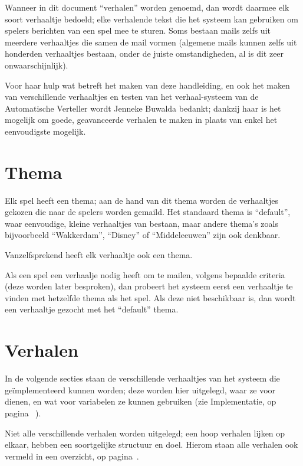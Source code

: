 \documentclass[12pt]{article}
\begin{document}
  Wanneer in dit document ``verhalen'' worden genoemd, dan wordt daarmee elk soort verhaaltje bedoeld; elke verhalende tekst die het systeem kan gebruiken om spelers berichten van een spel mee te sturen. Soms bestaan mails zelfs uit meerdere verhaaltjes die samen de mail vormen (algemene mails kunnen zelfs uit honderden verhaaltjes bestaan, onder de juiste omstandigheden, al is dit zeer onwaarschijnlijk).
  
  Voor haar hulp wat betreft het maken van deze handleiding, en ook het maken van verschillende verhaaltjes en testen van het verhaal-systeem van de Automatische Verteller wordt Jenneke Buwalda bedankt; dankzij haar is het mogelijk om goede, geavanceerde verhalen te maken in plaats van enkel het eenvoudigste mogelijk.

\section{Thema}

  Elk spel heeft een thema; aan de hand van dit thema worden de verhaaltjes gekozen die naar de spelers worden gemaild. Het standaard thema is ``default'', waar eenvoudige, kleine verhaaltjes van bestaan, maar andere thema's zoals bijvoorbeeld ``Wakkerdam'', ``Disney'' of ``Middeleeuwen'' zijn ook denkbaar.
  
  Vanzelfsprekend heeft elk verhaaltje ook een thema.
  
  Als een spel een verhaalje nodig heeft om te mailen, volgens bepaalde criteria (deze worden later besproken), dan probeert het systeem eerst een verhaaltje te vinden met hetzelfde thema als het spel. Als deze niet beschikbaar is, dan wordt een verhaaltje gezocht met het ``default'' thema.

\section{Verhalen}

  In de volgende secties staan de verschillende verhaaltjes van het systeem die ge\"implementeerd kunnen worden; deze worden hier uitgelegd, waar ze voor dienen, en wat voor variabelen ze kunnen gebruiken (zie Implementatie, op pagina~\pageref{subsec:Variabelen} ). 
  
  Niet alle verschillende verhalen worden uitgelegd; een hoop verhalen lijken op elkaar, hebben een soortgelijke structuur en doel. Hierom staan alle verhalen ook vermeld in een overzicht, op pagina~\pageref{sec:Overzicht}.
  
\end{document}
